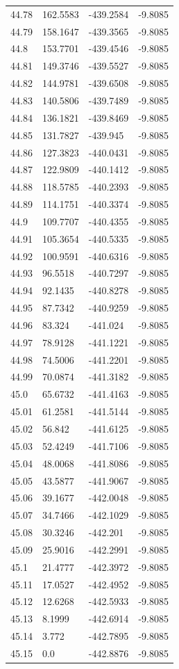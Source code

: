 \begin{table}[H]
\begin{tabular}{llll}
44.78 & 162.5583 & -439.2584 & -9.8085 \\
44.79 & 158.1647 & -439.3565 & -9.8085 \\
44.8 & 153.7701 & -439.4546 & -9.8085 \\
44.81 & 149.3746 & -439.5527 & -9.8085 \\
44.82 & 144.9781 & -439.6508 & -9.8085 \\
44.83 & 140.5806 & -439.7489 & -9.8085 \\
44.84 & 136.1821 & -439.8469 & -9.8085 \\
44.85 & 131.7827 & -439.945 & -9.8085 \\
44.86 & 127.3823 & -440.0431 & -9.8085 \\
44.87 & 122.9809 & -440.1412 & -9.8085 \\
44.88 & 118.5785 & -440.2393 & -9.8085 \\
44.89 & 114.1751 & -440.3374 & -9.8085 \\
44.9 & 109.7707 & -440.4355 & -9.8085 \\
44.91 & 105.3654 & -440.5335 & -9.8085 \\
44.92 & 100.9591 & -440.6316 & -9.8085 \\
44.93 & 96.5518 & -440.7297 & -9.8085 \\
44.94 & 92.1435 & -440.8278 & -9.8085 \\
44.95 & 87.7342 & -440.9259 & -9.8085 \\
44.96 & 83.324 & -441.024 & -9.8085 \\
44.97 & 78.9128 & -441.1221 & -9.8085 \\
44.98 & 74.5006 & -441.2201 & -9.8085 \\
44.99 & 70.0874 & -441.3182 & -9.8085 \\
45.0 & 65.6732 & -441.4163 & -9.8085 \\
45.01 & 61.2581 & -441.5144 & -9.8085 \\
45.02 & 56.842 & -441.6125 & -9.8085 \\
45.03 & 52.4249 & -441.7106 & -9.8085 \\
45.04 & 48.0068 & -441.8086 & -9.8085 \\
45.05 & 43.5877 & -441.9067 & -9.8085 \\
45.06 & 39.1677 & -442.0048 & -9.8085 \\
45.07 & 34.7466 & -442.1029 & -9.8085 \\
45.08 & 30.3246 & -442.201 & -9.8085 \\
45.09 & 25.9016 & -442.2991 & -9.8085 \\
45.1 & 21.4777 & -442.3972 & -9.8085 \\
45.11 & 17.0527 & -442.4952 & -9.8085 \\
45.12 & 12.6268 & -442.5933 & -9.8085 \\
45.13 & 8.1999 & -442.6914 & -9.8085 \\
45.14 & 3.772 & -442.7895 & -9.8085 \\
45.15 & 0.0 & -442.8876 & -9.8085 \\
\bottomrule
\end{tabular}

\end{table}
